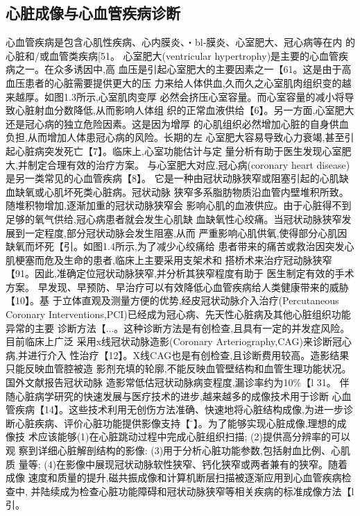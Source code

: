 \subsection{心脏成像与心血管疾病诊断}
心血管疾病是包含心肌性疾病、心内膜炎、・bl-膜炎、心室肥大、冠心病等在内
的心脏和/或血管类疾病[51。
心室肥大(ventricular hypertrophy)是主要的心血管疾病之一。在众多诱因中,高
血压是引起心室肥大的主要因素之一【61。这是由于高血压患者的心脏需要提供更大的压
力来给人体供血,久而久之心室肌肉组织变的越来越厚。如图1.3所示,心室肌肉变厚
必然会挤压心室容量。而心室容量的减小将导致心脏射血分数降低,从而影响人体组
织的正常血液供给【6】。另一方面,心室肥大还是冠心病的独立危险因素。这是因为增厚
的心肌组织必然增加心脏的自身供血负担,从而增加人体患冠心病的风险。长期的左
心室肥大容易导致心力衰竭,甚至引起心脏病突发死亡【7】。临床上,心室功能估计与定
量分析有助于医生发现心室肥大,并制定合理有效的治疗方案。
与心室肥大对应,冠心病(coronary
 heart
  disease)是另一类常见的心血管疾病【8】。
  它是一种由冠状动脉狭窄或阻塞引起的心肌缺血缺氧或心肌坏死类心脏病。冠状动脉
  狭窄多系脂肪物质沿血管内壁堆积所致。随堆积物增加,逐渐加重的冠状动脉狭窄会
  影响心肌的血液供应。由于心脏得不到足够的氧气供给,冠心病患者就会发生心肌缺
  血缺氧性心绞痛。当冠状动脉狭窄发展到一定程度,部分冠状动脉会发生阻塞,从而
  严重影响心肌供氧,使得部分心肌因缺氧而坏死【引。如图1.4所示,为了减少心绞痛给
  患者带来的痛苦或救治因突发心肌梗塞而危及生命的患者,临床上主要采用支架术和
  搭桥术来治疗冠动脉狭窄【91。因此,准确定位冠状动脉狭窄,并分析其狭窄程度有助于
  医生制定有效的手术方案。
  早发现、早预防、早治疗可以有效降低心血管疾病给人类健康带来的威胁【10】。基
  于立体直观及测量方便的优势,经皮冠状动脉介入治疗(Percutaneous
   Coronary
   Interventions,PCI)已经成为冠心病、先天性心脏病及其他心脏组织功能异常的主要
   诊断方法【...。这种诊断方法是有创检查,且具有一定的并发症风险。目前临床上广泛
   采用x线冠状动脉造影(Coronary Arteriography,CAG)来诊断冠心病,并进行介入
   性治疗【12】。X线CAG也是有创检查,且诊断费用较高。造影结果只能反映血管腔被造
   影剂充填的轮廓,不能反映血管壁结构和血管生理功能状况。国外文献报告冠状动脉
   造影常低估冠状动脉病变程度,漏诊率约为10\%【l 31。
伴随心脏病学研究的快速发展与医疗技术的进步,越来越多的成像技术用于诊断
心血管疾病【14】。这些技术利用无创伤方法准确、快速地将心脏结构成像,为进一步诊
断心脏疾病、评价心脏功能提供影像支持【 ̈】。为了能够实现心脏成像,理想的成像技
术应该能够(1)在心脏跳动过程中完成心脏组织扫描;
 (2)提供高分辨率的可以观
 察到详细心脏解剖结构的影像:
  (3)用于分析心脏功能参数,包括射血比例、心肌质
  量等;
   (4)在影像中展现冠状动脉软性狭窄、钙化狭窄或两者兼有的狭窄。随着成像
   速度和质量的提升,磁共振成像和计算机断层扫描被逐渐应用到心血管疾病检查中,
   并陆续成为检查心脏功能障碍和冠状动脉狭窄等相关疾病的标准成像方法【l引。

